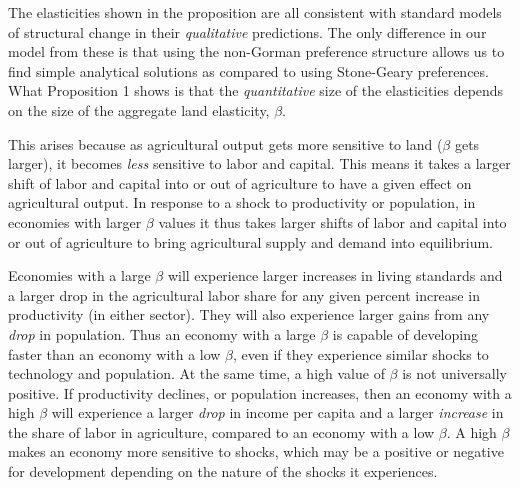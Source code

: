 \documentclass[11pt]{article}
\begin{document}
\vspace{.3cm} The elasticities shown in the proposition are all consistent with standard models of structural change \citep{kp2001,Gollin:2007oq,Restuccia:2008hc,Gollin:2010ys,vollrath2011,Alvarez-Cuadrado:2011nx,hrv2014,duarte2010role} in their \textit{qualitative} predictions. The only difference in our model from these is that using the non-Gorman preference structure allows us to find simple analytical solutions as compared to using Stone-Geary preferences. What Proposition 1 shows is that the \textit{quantitative} size of the elasticities depends on the size of the aggregate land elasticity, $\beta$. 

This arises because as agricultural output gets more sensitive to land ($\beta$ gets larger), it becomes \textit{less} sensitive to labor and capital. This means it takes a larger shift of labor and capital into or out of agriculture to have a given effect on agricultural output. In response to a shock to productivity or population, in economies with larger $\beta$ values it thus takes larger shifts of labor and capital into or out of agriculture to bring agricultural supply and demand into equilibrium. 

Economies with a large $\beta$ will experience larger increases in living standards and a larger drop in the agricultural labor share for any given percent increase in productivity (in either sector). They will also experience larger gains from any \textit{drop} in population. Thus an economy with a large $\beta$ is capable of developing faster than an economy with a low $\beta$, even if they experience similar shocks to technology and population. At the same time, a high value of $\beta$ is not universally positive. If productivity declines, or population increases, then an economy with a high $\beta$ will experience a larger \textit{drop} in income per capita and a larger \textit{increase} in the share of labor in agriculture, compared to an economy with a low $\beta$. A high $\beta$ makes an economy more sensitive to shocks, which may be a positive or negative for development depending on the nature of the shocks it experiences.
\end{document}
